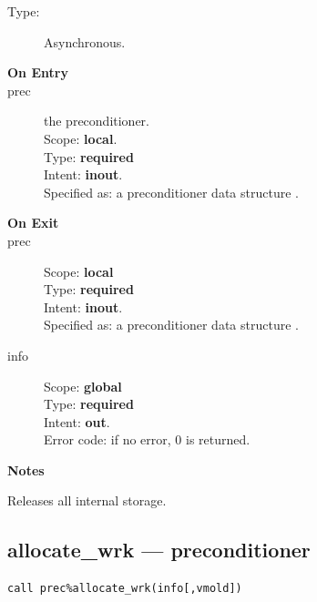 \begin{description}
\item[Type:] Asynchronous.
\item[\bf On Entry]
\item[prec] the preconditioner.\\
Scope: {\bf local}.\\
Type: {\bf required}\\
Intent: {\bf inout}.\\
Specified as: a preconditioner data structure \precdata.
\item[\bf On Exit]

\item[prec] 
Scope: {\bf local} \\
Type: {\bf required}\\
Intent: {\bf inout}.\\
Specified as: a preconditioner data structure \precdata.
\item[info] 
Scope: {\bf global} \\
Type: {\bf required}\\
Intent: {\bf out}.\\
Error code: if no error, 0 is returned.
\end{description}
{\par\noindent\large\bfseries Notes}
Releases all internal storage.


\clearpage\subsection{allocate\_wrk --- preconditioner}
\label{sec:allocatewrk}
\begin{verbatim}
call prec%allocate_wrk(info[,vmold])
\end{verbatim}

